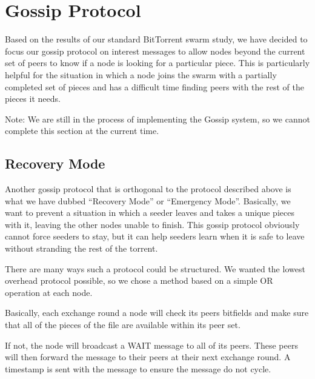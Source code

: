 \section{Gossip Protocol}

Based on the results of our standard BitTorrent swarm study, we have
decided to focus our gossip protocol on interest messages to allow
nodes beyond the current set of peers to know if a node is looking for
a particular piece. This is particularly helpful for the situation in
which a node joins the swarm with a partially completed set of pieces
and has a difficult time finding peers with the rest of the pieces it
needs.

Note: We are still in the process of implementing the Gossip system, so
we cannot complete this section at the current time.

\subsection{Recovery Mode}

Another gossip protocol that is orthogonal to the protocol described above is 
what we have dubbed ``Recovery Mode'' or ``Emergency Mode''. Basically, we
want to prevent a situation in which a seeder leaves and takes a unique pieces
with it, leaving the other nodes unable to finish. This gossip protocol obviously
cannot force seeders to stay, but it can help seeders learn when it is safe to
leave without stranding the rest of the torrent. 

There are many ways such a protocol could be structured. We wanted the lowest
overhead protocol possible, so we chose a method based on a simple OR operation
at each node. 

Basically, each exchange round a node will check its peers bitfields
and make sure that all of the pieces of the file are available within its peer
set.

If not, the node will broadcast a WAIT message to all of its peers. These peers will
then forward the message to their peers at their next exchange round. A timestamp
is sent with the message to ensure the message do not cycle. 


